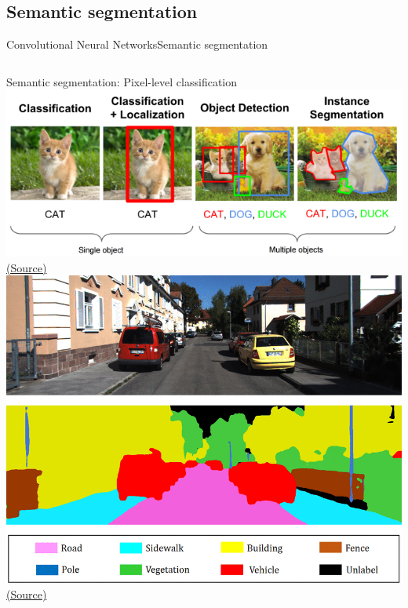\documentclass[10pt,compress]{beamer} %
\begin{document}
\subsection{Semantic segmentation}
\begin{frame}{Convolutional Neural Networks}{Semantic segmentation}
    \begin{columns}
	\flushleft
	Semantic segmentation: Pixel-level classification
	\medskip
	\centering
        \includegraphics[width=\textwidth]{figs/segmentation.png}\\
	\scriptsize\href{https://towardsdatascience.com/object-localization-in-overfeat-5bb2f7328b62}{(Source)}\\

    \includegraphics[width=\linewidth]{figs/semantic.png}\\
	    \centering
    \scriptsize\href{https://www.researchgate.net/figure/Example-of-2D-semantic-segmentation-Top-input-image-Bottom-prediction_fig3_326875064}{(Source)}\\
	\end{columns}
\end{frame}
\end{document}
